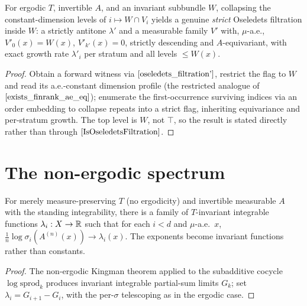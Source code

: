 \begin{theorem}\label{restricted_strict_filtration}
  \leanok
  For ergodic $T$, invertible $A$, and an invariant subbundle $W$, collapsing the constant-dimension levels of $i \mapsto W \cap V_i$ yields a genuine \emph{strict} Oseledets filtration inside $W$: a strictly antitone $\lambda'$ and a measurable family $V'$ with, $\mu$-a.e., $V'_0(x) = W(x)$, $V'_{k'}(x) = 0$, strictly descending and $A$-equivariant, with exact growth rate $\lambda'_i$ per stratum and all levels $\le W(x)$.
\end{theorem}
\begin{proof}\leanok
  Obtain a forward witness via $\ref{oseledets_filtration'}$, restrict the flag to $W$ and read its a.e.-constant dimension profile (the restricted analogue of $\ref{exists_finrank_ae_eq}$); enumerate the first-occurrence surviving indices via an order embedding to collapse repeats into a strict flag, inheriting equivariance and per-stratum growth. The top level is $W$, not $\top$, so the result is stated directly rather than through $\ref{IsOseledetsFiltration}$.
\end{proof}

\section{The non-ergodic spectrum}

\begin{theorem}\label{exists_exponents_nonergodic}
  \leanok
  For merely measure-preserving $T$ (no ergodicity) and invertible measurable $A$ with the standing integrability, there is a family of $T$-invariant integrable functions $\lambda_i : X \to \mathbb{R}$ such that for each $i < d$ and $\mu$-a.e.\ $x$, $\tfrac1n\log\sigma_i(A^{(n)}(x)) \to \lambda_i(x)$. The exponents become invariant functions rather than constants.
\end{theorem}
\begin{proof}\leanok
  The non-ergodic Kingman theorem applied to the subadditive cocycle $\log\mathrm{sprod}_k$ produces invariant integrable partial-sum limits $G_k$; set $\lambda_i = G_{i+1} - G_i$, with the per-$\sigma$ telescoping as in the ergodic case.
\end{proof}

